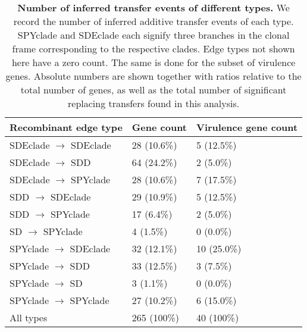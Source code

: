 \documentclass[12pt]{article}
\providecommand{\tabularnewline}{\\}
\begin{document}
\begin{table}[!ht]
\caption{
{\bf Number of inferred transfer events of different types.}  We record the number of inferred additive transfer events of each type. SPYclade and SDEclade each signify three branches in the clonal frame corresponding to the respective clades. Edge types not shown here have a zero count. The same is done for the subset of virulence genes. Absolute numbers are shown together with ratios relative to the total number of genes, as well as the total number of significant replacing transfers found in this analysis.}
\noindent \centering{}\begin{tabular}{lll}
\hline
Recombinant edge type & Gene count & Virulence gene count \tabularnewline
\hline
SDEclade $\rightarrow$ SDEclade & 28 (10.6\%) &  5 (12.5\%)\tabularnewline
SDEclade $\rightarrow$ SDD & 64 (24.2\%) & 2 (5.0\%)\tabularnewline
SDEclade $\rightarrow$ SPYclade & 28 (10.6\%) &  7 (17.5\%)\tabularnewline
SDD $\rightarrow$ SDEclade & 29 (10.9\%) &  5 (12.5\%)\tabularnewline
SDD $\rightarrow$ SPYclade & 17 (6.4\%) &  2 (5.0\%)\tabularnewline
SD $\rightarrow$  SPYclade &  4 (1.5\%) &  0 (0.0\%)\tabularnewline
SPYclade $\rightarrow$ SDEclade & 32 (12.1\%) & 10 (25.0\%)\tabularnewline
SPYclade $\rightarrow$ SDD & 33 (12.5\%) &  3 (7.5\%)\tabularnewline
SPYclade $\rightarrow$ SD &   3 (1.1\%) &  0 (0.0\%)\tabularnewline
SPYclade $\rightarrow$ SPYclade & 27 (10.2\%) &  6 (15.0\%)\tabularnewline
All types  &  265 (100\%) & 40 (100\%)  \tabularnewline
\hline
\end{tabular}
\label{tab:gene-counts-additive}
\end{table}
\end{document}
